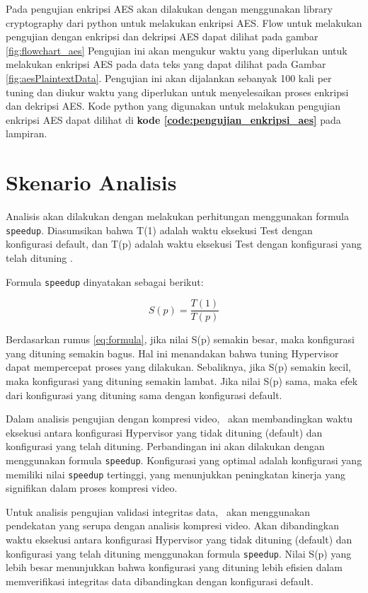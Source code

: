 Pada pengujian enkripsi AES akan dilakukan dengan menggunakan library cryptography dari python untuk melakukan enkripsi AES. Flow untuk melakukan pengujian dengan enkripsi dan dekripsi AES dapat dilihat pada gambar \ref{fig:flowchart_aes} Pengujian ini akan mengukur waktu yang diperlukan untuk melakukan enkripsi AES pada data teks yang dapat dilihat pada Gambar \ref{fig:aesPlaintextData}. Pengujian ini akan dijalankan sebanyak 100 kali per tuning dan diukur waktu yang diperlukan untuk menyelesaikan proses enkripsi dan dekripsi AES. Kode python yang digunakan untuk melakukan pengujian enkripsi AES dapat dilihat di \textbf{kode \ref{code:pengujian_enkripsi_aes}} pada lampiran.

\section{Skenario Analisis}
Analisis akan dilakukan dengan melakukan perhitungan menggunakan formula \texttt{speedup}. Diasumsikan bahwa T(1) adalah waktu eksekusi Test dengan konfigurasi default, dan T(p) adalah waktu eksekusi Test dengan konfigurasi yang telah dituning \cite{beuwolfCetin}.

Formula \texttt{speedup} dinyatakan sebagai berikut:

\begin{equation}
    S(p) = \frac{T(1)}{T(p)}
    \label{eq:formula}
\end{equation}

Berdasarkan rumus \ref{eq:formula}, jika nilai S(p) semakin besar, maka konfigurasi yang dituning semakin bagus. Hal ini menandakan bahwa tuning Hypervisor dapat mempercepat proses yang dilakukan. Sebaliknya, jika S(p) semakin kecil, maka konfigurasi yang dituning semakin lambat. Jika nilai S(p) sama, maka efek dari konfigurasi yang dituning sama dengan konfigurasi default.

Dalam analisis pengujian dengan kompresi video, \saya\ akan membandingkan waktu eksekusi antara konfigurasi Hypervisor yang tidak dituning (default) dan konfigurasi yang telah dituning. Perbandingan ini akan dilakukan dengan menggunakan formula \texttt{speedup}. Konfigurasi yang optimal adalah konfigurasi yang memiliki nilai \texttt{speedup} tertinggi, yang menunjukkan peningkatan kinerja yang signifikan dalam proses kompresi video.

Untuk analisis pengujian validasi integritas data, \saya\ akan menggunakan pendekatan yang serupa dengan analisis kompresi video. Akan dibandingkan waktu eksekusi antara konfigurasi Hypervisor yang tidak dituning (default) dan konfigurasi yang telah dituning menggunakan formula \texttt{speedup}. Nilai S(p) yang lebih besar menunjukkan bahwa konfigurasi yang dituning lebih efisien dalam memverifikasi integritas data dibandingkan dengan konfigurasi default.

